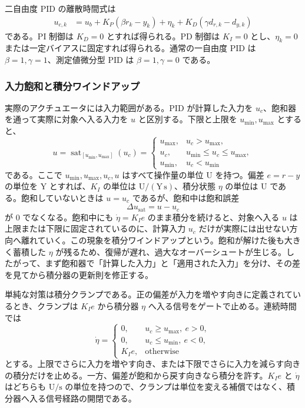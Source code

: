 二自由度 PID の離散時間式は
\begin{align}
  u_{c,k}
  &=u_b+K_P(\beta r_k-y_k)+\eta_k
  +K_D(\gamma d_{r,k}-d_{y,k})
  \label{eq:discrete-two-degree-pid}
\end{align}
である。PI 制御は $K_D=0$ とすれば得られる。PD 制御は $K_I=0$ とし、$\eta_k=0$ または一定バイアスに固定すれば得られる。通常の一自由度 PID は $\beta=1,\gamma=1$、測定値微分型 PID は $\beta=1,\gamma=0$ である。

\subsubsection{入力飽和と積分ワインドアップ}

実際のアクチュエータには入力範囲がある。PID が計算した入力を $u_c$、飽和器を通って実際に対象へ入る入力を $u$ と区別する。下限と上限を $u_{\min},u_{\max}$ とすると、
\begin{equation}
  u=\operatorname{sat}_{[u_{\min},u_{\max}]}(u_c)
  =
  \begin{cases}
    u_{\max}, & u_c>u_{\max},\\
    u_c, & u_{\min}\leq u_c\leq u_{\max},\\
    u_{\min}, & u_c<u_{\min}
  \end{cases}
\end{equation}
である。ここで $u_{\min},u_{\max},u_c,u$ はすべて操作量の単位 $\mathrm{U}$ を持つ。偏差 $e=r-y$ の単位を $\mathrm{Y}$ とすれば、$K_I$ の単位は $\mathrm{U}/(\mathrm{Y}\,\mathrm{s})$、積分状態 $\eta$ の単位は $\mathrm{U}$ である。飽和していないときは $u=u_c$ であるが、飽和中は飽和誤差
\begin{equation}
  \Delta u_{\mathrm{sat}}=u-u_c
  \label{eq:saturation-error}
\end{equation}
が 0 でなくなる。飽和中にも $\dot{\eta}=K_Ie$ のまま積分を続けると、対象へ入る $u$ は上限または下限に固定されているのに、計算入力 $u_c$ だけが実際には出せない方向へ離れていく。この現象を積分ワインドアップという。飽和が解けた後も大きく蓄積した $\eta$ が残るため、復帰が遅れ、過大なオーバーシュートが生じる。したがって、まず飽和器で「計算した入力」と「適用された入力」を分け、その差を見てから積分器の更新則を修正する。

単純な対策は積分クランプである。正の偏差が入力を増やす向きに定義されているとき、クランプは $K_Ie$ から積分器 $\eta$ へ入る信号をゲートで止める。連続時間では
\begin{equation}
  \dot{\eta}=
  \begin{cases}
    0, & u_c\geq u_{\max},\ e>0,\\
    0, & u_c\leq u_{\min},\ e<0,\\
    K_Ie, & \text{otherwise}
  \end{cases}
  \label{eq:integrator-clamping-continuous}
\end{equation}
とする。上限でさらに入力を増やす向き、または下限でさらに入力を減らす向きの積分だけを止める。一方、偏差が飽和から戻す向きなら積分を許す。$K_Ie$ と $\dot{\eta}$ はどちらも $\mathrm{U}/\mathrm{s}$ の単位を持つので、クランプは単位を変える補償ではなく、積分器へ入る信号経路の開閉である。

